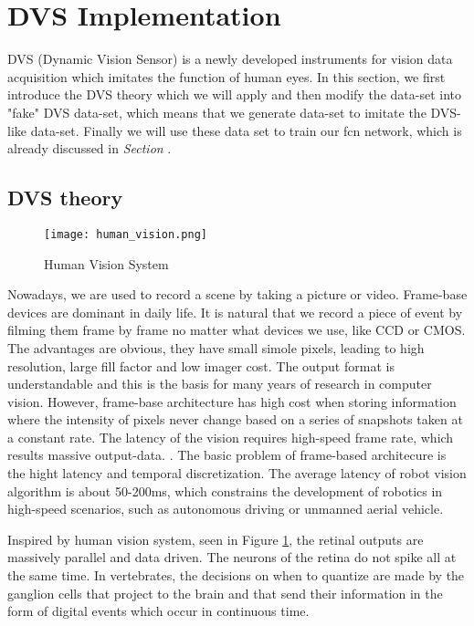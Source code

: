 
\section{DVS Implementation}
DVS (Dynamic Vision Sensor) is a newly developed instruments for vision data acquisition which imitates the function of human eyes. In this section, we first introduce the DVS theory which we will apply and then modify the data-set into "fake" DVS data-set, which means that we generate  data-set to imitate the DVS-like data-set. Finally we will use these data set to train our fcn network, which is already discussed in \emph{Section } .

\subsection{DVS theory}

\begin{figure}
	\centering\textbf{}
	\texttt{[image: human\_vision.png]}
	\caption{Human Vision System\cite{davide}}
	\label{fig:humanvision}
\end{figure}

Nowadays, we are used to record a scene by taking a picture or video. Frame-base devices are dominant in daily life. It is natural that we record a piece of event by filming them frame by frame no matter what devices we use, like CCD or CMOS. The advantages are obvious, they have small simole pixels, leading to high resolution, large fill factor and low imager cost. The output format is understandable and this is the basis for many years of research in computer vision. However, frame-base architecture has high cost when storing information where the intensity of pixels never change based on a series of snapshots taken at a constant rate. The latency of the vision requires high-speed frame rate, which results massive output-data. \cite{lichtsteiner2008128}. The basic problem of frame-based architecure is the hight latency and temporal discretization. The average latency of robot vision algorithm is about 50-200ms, which constrains the development of robotics in high-speed scenarios, such as autonomous driving or unmanned aerial vehicle.

Inspired by human vision system, seen in Figure \ref{fig:humanvision}, the retinal outputs are massively parallel and data driven. The neurons of the retina do not spike all at the same time. In vertebrates, the decisions on when to quantize are made by the ganglion cells that project to the brain and that send their information in the form of digital events which occur in continuous time.\cite{liu2015event} 


